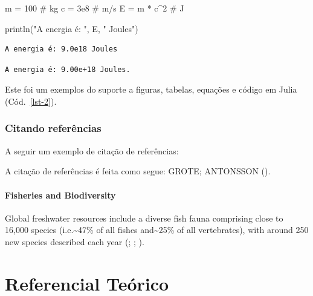 \documentclass[
  12pt,
  oneside,
  a4paper,
  english,
  brazil]{abntex2}
\newenvironment{Shaded}{}{}
\newcommand{\CommentTok}[1]{\textcolor[rgb]{0.42,0.45,0.49}{#1}}
\newcommand{\FloatTok}[1]{\textcolor[rgb]{0.00,0.36,0.77}{#1}}
\newcommand{\FunctionTok}[1]{\textcolor[rgb]{0.44,0.26,0.76}{#1}}
\newcommand{\NormalTok}[1]{\textcolor[rgb]{0.14,0.16,0.18}{#1}}
\newcommand{\OperatorTok}[1]{\textcolor[rgb]{0.14,0.16,0.18}{#1}}
\newcommand{\StringTok}[1]{\textcolor[rgb]{0.01,0.18,0.38}{#1}}
\begin{document}
\begin{Shaded}
\begin{Highlighting}[]
\NormalTok{m }\OperatorTok{=} \FloatTok{100} \CommentTok{\# kg}
\NormalTok{c }\OperatorTok{=} \FloatTok{3e8} \CommentTok{\# m/s}
\NormalTok{E }\OperatorTok{=}\NormalTok{ m }\OperatorTok{*}\NormalTok{ c}\OperatorTok{\^{}}\FloatTok{2} \CommentTok{\# J}

\FunctionTok{println}\NormalTok{(}\StringTok{"A energia é: "}\NormalTok{, E, }\StringTok{" Joules"}\NormalTok{)}
\end{Highlighting}
\end{Shaded}

\begin{verbatim}
A energia é: 9.0e18 Joules
\end{verbatim}

\begin{verbatim}
A energia é: 9.00e+18 Joules.
\end{verbatim}

Este foi um exemplos do suporte a figuras, tabelas, equações e código em
Julia (Cód.~\ref{lst-2}).

\subsection{Citando referências}\label{citando-referuxeancias}

A seguir um exemplo de citação de referências:

A citação de referências é feita como segue: GROTE; ANTONSSON
().

\subsubsection{Fisheries and
Biodiversity}\label{fisheries-and-biodiversity}

Global freshwater resources include a diverse fish fauna comprising
close to 16,000 species (i.e.\textasciitilde47\% of all fishes
and\textasciitilde25\% of all vertebrates), with around 250 new species
described each year (; ; ).

\chapter{Referencial Teórico}
\end{document}

